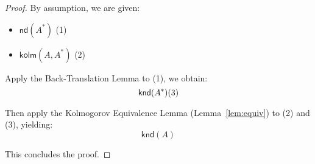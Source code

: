 \documentclass{article}
\begin{document}
    
    \begin{proof}
    By assumption, we are given:
    \begin{itemize}
        \item $\textsf{nd}(A^*)$ \hfill (1)
        \item $\textsf{kolm}(A, A^*)$ \hfill (2)
    \end{itemize}
    
    Apply the Back-Translation Lemma to (1), we obtain:
    \[
    \textsf{knd}(A^*) \hfill (3)
    \]
    
    Then apply the Kolmogorov Equivalence Lemma (Lemma~\ref{lem:equiv}) to (2) and (3), yielding:
    \[
    \textsf{knd}(A)
    \]
    
    This concludes the proof.
    \end{proof}






















  
  
\end{document}
